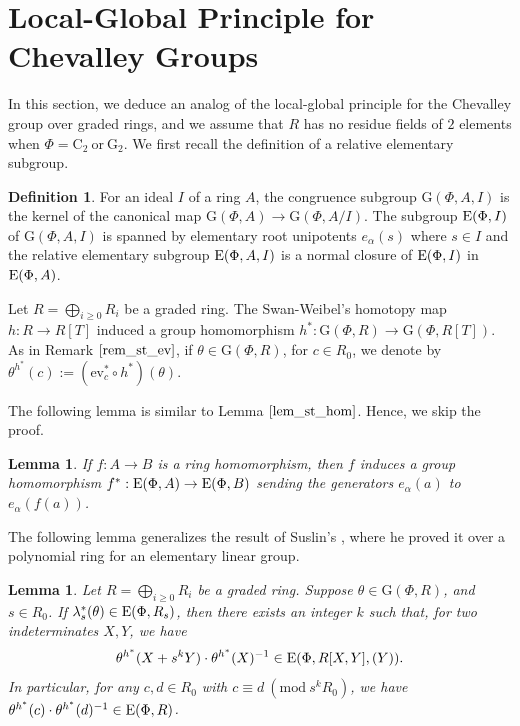 \documentclass[11pt]{amsart}
\newtheorem{lem}[thm]{Lemma}
\theoremstyle{definition}
\newtheorem{defn}[thm]{Definition}
\numberwithin{equation}{section}
\numberwithin{equation}{section}
\newcommand{\C}{\mathrm{C}}
\newcommand{\G}{\mathrm{G}}
\newcommand{\<}{\langle}
\renewcommand{\>}{\rangle}
\newcommand{\El}{{\operatorname{\rm E}}}
\newcommand{\ev}{\mathrm{ev}}
\begin{document}
\section{Local-Global Principle for Chevalley Groups}
In this section, we deduce an analog of the local-global principle for the Chevalley group over graded rings, and we assume that $R$ has no residue fields of $2$ elements when $\Phi=\C_{2}~\text{or}~\G_{2}$. We first recall the definition of a relative elementary subgroup.
\begin{defn}
     For an ideal $I$ of a ring $A$, the congruence subgroup $\G(\Phi,A,I)$ is the kernel of the canonical map $\G(\Phi,A)\to \G(\Phi,A/I)$. The subgroup $\El(\Phi,I)$ of $\G(\Phi,A,I)$ is spanned by elementary root unipotents $e_{\alpha}(s)$ where $s\in I$ and the relative elementary subgroup $\El(\Phi,A,I)$ is a normal closure of $\El(\Phi,I)$ in $\El(\Phi,A)$.
\end{defn}    
Let $R=\bigoplus_{i\geq 0}R_{i}$ be a graded ring. The Swan-Weibel’s homotopy map $h:R\to R[T]$ induced a group homomorphism  $h^{\ast}:\G(\Phi,R)\to \G(\Phi,R[T])$. As in Remark $\ref{rem_st_ev}$, if $\theta\in \G(\Phi,R)$, for $c\in R_{0}$, we denote by $\theta^{h^{\ast}}(c):=(\ev_{c}^{\ast}\circ h^{\ast})(\theta)$.\par
The following lemma is similar to Lemma $\ref{lem_st_hom}$. Hence, we skip the proof.
\begin{lem}
     If $f: A\to B$  is a ring homomorphism, then $f$ induces a group homomorphism $f^{\ast}:\El(\Phi,A)\to \El(\Phi, B)$ sending the generators $e_{\alpha}(a)$ to $e_{\alpha}(f(a))$.\label{lem_el_hom}
\end{lem}
The following lemma generalizes the result of Suslin's \cite[Lemma 3.4]{Su77}, where he proved it over a polynomial ring for an elementary linear group.
\begin{lem}\label{lem_cong_chgp}
    Let $R=\bigoplus_{i\geq 0}R_{i}$ be a graded ring. Suppose $\theta\in \G(\Phi,R)$, and $s\in R_{0}$. If $\lambda^{\ast}_{s}(\theta)\in\El(\Phi,R_{s})$, then there exists an integer $k$ such that, for two indeterminates $X,Y$, we have \[\theta^{h^{\ast}}(X+s^{k}Y)\cdot\theta^{h^{\ast}}(X)^{-1}\in\El(\Phi,R[X,Y],(Y)).\] In particular, for any $c,d\in R_{0}$ with $c\equiv d ~(\text{mod} ~s^{k}R_{0})$, we have $\theta^{h^{\ast}}(c)\cdot\theta^{h^{\ast}}(d)^{-1}\in\El(\Phi,R)$.
\end{lem}
\end{document}
